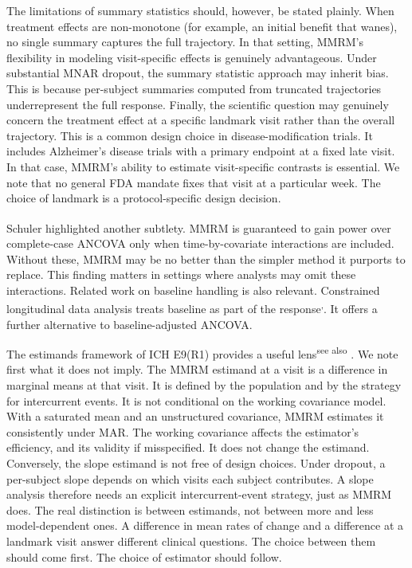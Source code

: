 \documentclass[
  11pt,
]{article}
\begin{document}
The limitations of summary statistics should, however, be
stated plainly. When treatment effects are non-monotone (for
example, an initial benefit that wanes), no single summary
captures the full trajectory. In that setting, MMRM's
flexibility in modeling visit-specific effects is genuinely
advantageous. Under substantial MNAR dropout, the summary
statistic approach may inherit bias. This is because
per-subject summaries computed from truncated trajectories
underrepresent the full response. Finally, the scientific
question may genuinely concern the treatment effect at a
specific landmark visit rather than the overall trajectory.
This is a common design choice in disease-modification trials.
It includes Alzheimer's disease trials with a primary endpoint
at a fixed late visit. In that case, MMRM's ability to
estimate visit-specific contrasts is essential. We note that
no general FDA mandate fixes that visit at a particular week.
The choice of landmark is a protocol-specific design decision.

Schuler\textsuperscript{} highlighted another
subtlety. MMRM is guaranteed to gain power over complete-case
ANCOVA only when time-by-covariate interactions are included.
Without these, MMRM may be no better than the simpler method it
purports to replace. This finding matters in settings where
analysts may omit these interactions. Related work on baseline
handling is also relevant. Constrained longitudinal data
analysis treats baseline as part of the response\textsuperscript{,}.
It offers a further alternative to baseline-adjusted ANCOVA.

The estimands framework of ICH E9(R1)\textsuperscript{} provides a
useful lens\textsuperscript{see also }.
We note first what it does not imply. The MMRM estimand at a
visit is a difference in marginal means at that visit. It is
defined by the population and by the strategy for
intercurrent events. It is not conditional on the working
covariance model. With a saturated mean and an unstructured
covariance, MMRM estimates it consistently under MAR. The
working covariance affects the estimator's efficiency, and
its validity if misspecified. It does not change the estimand.
Conversely, the slope estimand is not free of design choices.
Under dropout, a per-subject slope depends on which visits
each subject contributes. A slope analysis therefore needs an
explicit intercurrent-event strategy, just as MMRM does. The
real distinction is between estimands, not between more and
less model-dependent ones. A difference in mean rates of change
and a difference at a landmark visit answer different clinical
questions. The choice between them should come first. The
choice of estimator should follow.
\end{document}
